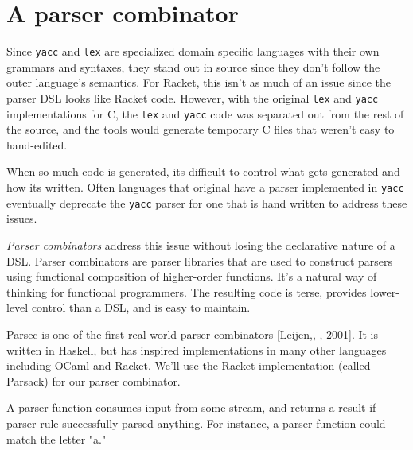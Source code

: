 \documentclass{book}
\newcommand{\Scribtexttt}[1]{{\texttt{#1}}}
\let\SOriginalthesubsubsection\thesubsubsection
\newcommand{\Ssubsection}[2]{\subsection[#1]{#2}\let\thesubsubsection\SOriginalthesubsubsection}
\renewcommand{\Ssubsection}[2]{\section[#1]{#2}}
\begin{document}
\Ssubsection{A parser combinator }{A parser combinator }\label{t:x28part_x22Ax5fparserx5fcombinatorx5fx22x29}

Since \Scribtexttt{yacc} and \Scribtexttt{lex} are specialized domain specific languages with
their own grammars and syntaxes, they stand out in source since they don{'}t
follow the outer language{'}s semantics. For Racket, this isn{'}t as much of
an issue since the parser DSL looks like Racket code. However, with the
original \Scribtexttt{lex} and \Scribtexttt{yacc} implementations for C, the \Scribtexttt{lex} and
\Scribtexttt{yacc} code was separated out from the rest of the source, and the
tools would generate temporary C files that weren{'}t easy to hand{-}edited.

When so much code is generated, its difficult to control what gets
generated and how its written. Often languages that original have a parser
implemented in \Scribtexttt{yacc} eventually deprecate the \Scribtexttt{yacc} parser for one
that is hand written to address these issues.

\textit{Parser combinators} address this issue without losing the
declarative nature of a DSL. Parser combinators are parser libraries that
are used to construct parsers using functional composition of
higher{-}order functions. It{'}s a natural way of thinking for functional
programmers. The resulting code is terse, provides lower{-}level control
than a DSL, and is easy to maintain.

Parsec is one of the first real{-}world parser combinators [Leijen,,
, 2001]. It is written in Haskell, but has inspired implementations in many
other languages including OCaml and Racket. We{'}ll use the Racket
implementation (called Parsack) for our parser combinator.

A parser function consumes input from some stream, and returns a result if
parser rule successfully parsed anything. For instance, a parser function
could match the letter "a."
\end{document}
